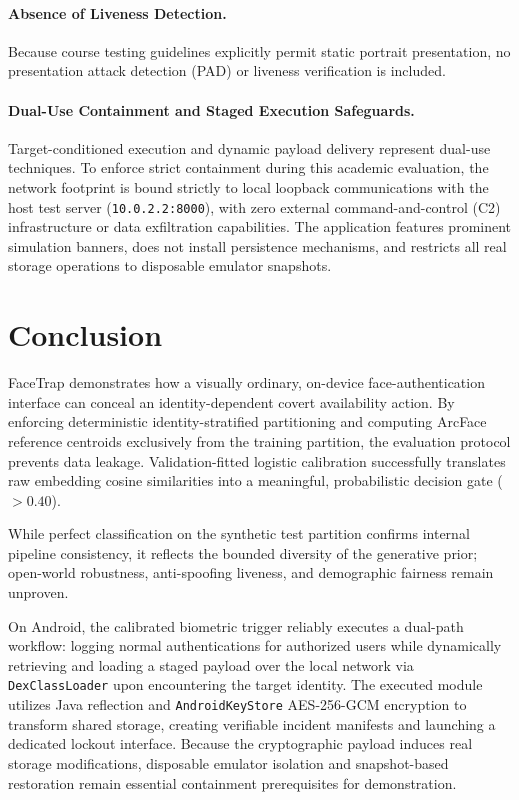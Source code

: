 \documentclass{article}
\begin{document}
\paragraph{Absence of Liveness Detection.} Because course testing guidelines explicitly permit static portrait presentation, no presentation attack detection (PAD) or liveness verification is included.
\paragraph{Dual-Use Containment and Staged Execution Safeguards.} Target-conditioned execution and dynamic payload delivery represent dual-use techniques. To enforce strict containment during this academic evaluation, the network footprint is bound strictly to local loopback communications with the host test server (\texttt{10.0.2.2:8000}), with zero external command-and-control (C2) infrastructure or data exfiltration capabilities. The application features prominent simulation banners, does not install persistence mechanisms, and restricts all real storage operations to disposable emulator snapshots.

\section{Conclusion}

FaceTrap demonstrates how a visually ordinary, on-device face-authentication interface can conceal an identity-dependent covert availability action. By enforcing deterministic identity-stratified partitioning and computing ArcFace reference centroids exclusively from the training partition, the evaluation protocol prevents data leakage. Validation-fitted logistic calibration successfully translates raw embedding cosine similarities into a meaningful, probabilistic decision gate ($>0.40$). 

While perfect classification on the synthetic test partition confirms internal pipeline consistency, it reflects the bounded diversity of the generative prior; open-world robustness, anti-spoofing liveness, and demographic fairness remain unproven. 

On Android, the calibrated biometric trigger reliably executes a dual-path workflow: logging normal authentications for authorized users while dynamically retrieving and loading a staged payload over the local network via \texttt{DexClassLoader} upon encountering the target identity. The executed module utilizes Java reflection and \texttt{AndroidKeyStore} AES-256-GCM encryption to transform shared storage, creating verifiable incident manifests and launching a dedicated lockout interface. Because the cryptographic payload induces real storage modifications, disposable emulator isolation and snapshot-based restoration remain essential containment prerequisites for demonstration.
\end{document}

